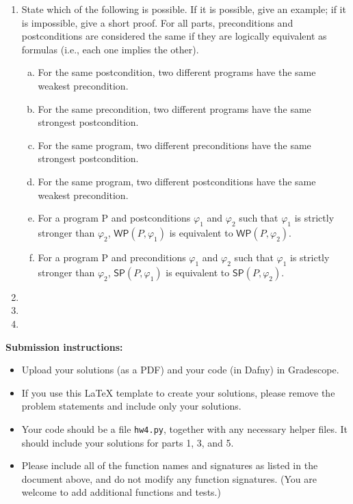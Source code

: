 \documentclass{article}
\renewcommand{\wp}{\mathsf{WP}}
\renewcommand{\sp}{\mathsf{SP}}
\begin{document}
\begin{enumerate}
\item
State which of the following is possible.
If it is possible, give an example; if it is impossible, give a short proof.
For all parts, preconditions and postconditions are considered the same if they are
logically equivalent as formulas (i.e., each one implies the other).
\begin{enumerate}[(a)]
\item
For the same postcondition, two different programs have the same weakest precondition.
\item
For the same precondition, two different programs have the same strongest postcondition.
\item
For the same program, two different preconditions have the same strongest postcondition.
\item
For the same program, two different postconditions have the same weakest precondition.
\item
For a program P and postconditions $\varphi_1$ and $\varphi_2$ such that $\varphi_1$ is strictly stronger than $\varphi_2$,
$\wp(P, \varphi_1)$ is equivalent to $\wp(P, \varphi_2)$.
\item
For a program P and preconditions $\varphi_1$ and $\varphi_2$ such that $\varphi_1$ is strictly stronger than $\varphi_2$, $\sp(P, \varphi_1)$ is equivalent to $\sp(P, \varphi_2)$.
\end{enumerate}

\item

\item

\item

\end{enumerate}

\noindent
\textbf{Submission instructions:}
\begin{itemize}
\item Upload your solutions (as a PDF) and your code (in Dafny) in Gradescope.
\item If you use this LaTeX template to create your solutions, please remove the problem statements
and include only your solutions.
\item Your code should be a file \texttt{hw4.py}, together with any necessary helper files.
It should include your solutions for parts 1, 3, and 5.
\item Please include all of the function names and signatures as listed in the document above,
and do not modify any function signatures. (You are welcome to add additional functions and tests.)
\end{itemize}
\end{document}

